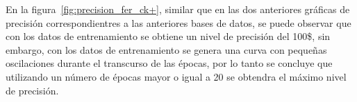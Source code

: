 En la figura~\ref{fig:precision_fer_ck+}, similar que en las dos anteriores gráficas de precisión correspondientres a las anteriores bases de datos, se puede observar que con los datos de entrenamiento se obtiene un nivel de precisión del 100\$, sin embargo, con los datos de entrenamiento se genera una curva con pequeñas oscilaciones durante el transcurso de las épocas, por lo tanto se concluye que utilizando un número de épocas mayor o igual a 20 se obtendra el máximo nivel de precisión.




